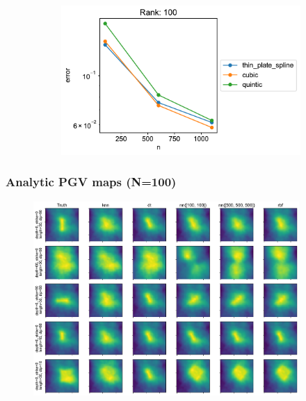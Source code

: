 \documentclass{beamer}
\begin{document}
\begin{frame}
\begin{figure}
\begin{subfigure}[b]{0.45\textwidth}
            \end{subfigure}
            \hfill
            \begin{subfigure}[b]{0.45\textwidth}
                \centering
                \includegraphics[width=\textwidth]{figs/errors_interps_rbf_100.pdf}
            \end{subfigure}
        \end{figure}
    \end{frame}
    \begin{frame}
        \frametitle{Analytic PGV maps (N=100)}
        \begin{figure}
            \includegraphics[width=0.9\textwidth]{figs/analytic_pgv_maps_100.pdf}
        \end{figure}
    \end{frame}
\end{document}
